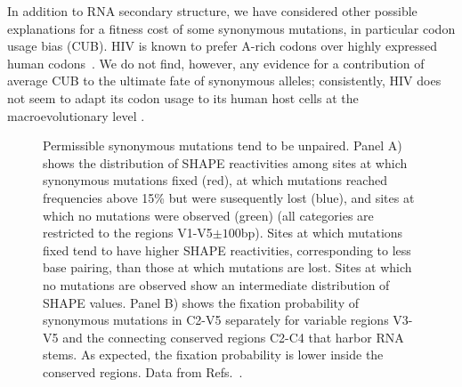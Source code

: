 \documentclass[rmp, twocolumn]{revtex4}
\newcommand{\shankaregion}{C2-V5}
\begin{document}
In addition to RNA secondary structure, we have considered other possible
explanations for a fitness cost of some synonymous mutations, in particular codon
usage bias (CUB). HIV is known to prefer A-rich codons over highly expressed
human codons~\citep{jenkins_extent_2003,kuyl_biased_2012}. We do not find,
however, any evidence for a contribution of average CUB to the ultimate fate of
synonymous alleles; consistently, HIV does not seem to adapt its codon usage to
its human host cells at the macroevolutionary level \citep{kuyl_biased_2012}.

\begin{figure}
\begin{center}
\caption{Permissible synonymous mutations tend to be unpaired.
Panel A) shows the distribution of SHAPE reactivities among sites at which synonymous 
mutations fixed (red), at which mutations reached frequencies above 15\% but
were susequently lost (blue), and sites at which no mutations were observed (green) 
(all categories are restricted to the regions V1-V5$\pm 100$bp).
Sites at which mutations fixed tend to have higher SHAPE reactivities, corresponding to
less base pairing, than those at which mutations are lost.
Sites at which no mutations are observed show an intermediate distribution of SHAPE values.
Panel B) shows the fixation probability of synonymous mutations in
\shankaregion{} separately for variable regions V3-V5 and the connecting conserved 
regions C2-C4 that harbor RNA stems. As expected, the fixation probability is lower
inside the conserved regions. Data from Refs.~\cite{shankarappa_consistent_1999,
bunnik_autologous_2008, liu_selection_2006}.}
\label{fig:SHAPE}
\end{center}
\end{figure}
\end{document}
